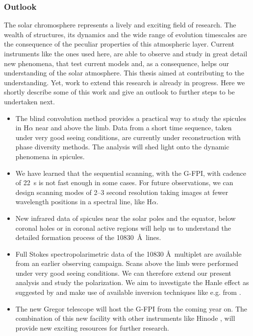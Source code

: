 \subsubsection*{Outlook}

The solar chromosphere represents a lively and exciting field of research. The wealth of structures, its dynamics and the wide range of evolution timescales are the consequence of the peculiar properties of this atmospheric layer. Current instruments like the ones used here, are able to observe and study in great detail new phenomena, that test current models and, as a consequence, helps our understanding of the solar atmosphere. This thesis aimed at contributing to the understanding. Yet, work to extend this research is already in progress. Here we shortly describe some of this work and give an outlook to further steps to be undertaken next.
\begin{itemize}
\item
The blind convolution method provides a practical way to study the spicules in H$\alpha$ near and above the limb. Data from a short time sequence, taken under very good seeing conditions, are currently under reconstruction with phase diversity methods. The analysis will shed light onto the dynamic phenomena in spicules.
\item
We have learned that the sequential scanning, with the G-FPI, with cadence of 22~s is not fast enough in some cases. For future
observations, we can design scanning modes of 2--3 second resolution taking images at fewer wavelength positions in a spectral line, like H$\alpha$.

\item New infrared data of spicules near the solar poles and the equator, below coronal 
holes or in coronal active regions will help us to understand the detailed 
formation process of the  10830~\AA\ lines.

\item Full Stokes spectropolarimetric data of the  10830 \AA\, multiplet are available from an earlier  observing campaign. Scans above the limb were performed under very good seeing conditions. We can therefore extend our present analysis and study the polarization. We aim to investigate the Hanle effect as suggested by \cite{truj05} and make use of available inversion techniques like e.g. from \cite{2004A&A...414.1109L}.

\item The new Gregor telescope  \citep{2007ASPC..368..605B} will host the G-FPI from the coming year on. The combination of this new facility with other instruments like Hinode  \citep{2007SoPh..243....3K}, will provide new exciting resources for further research.
\end{itemize}

